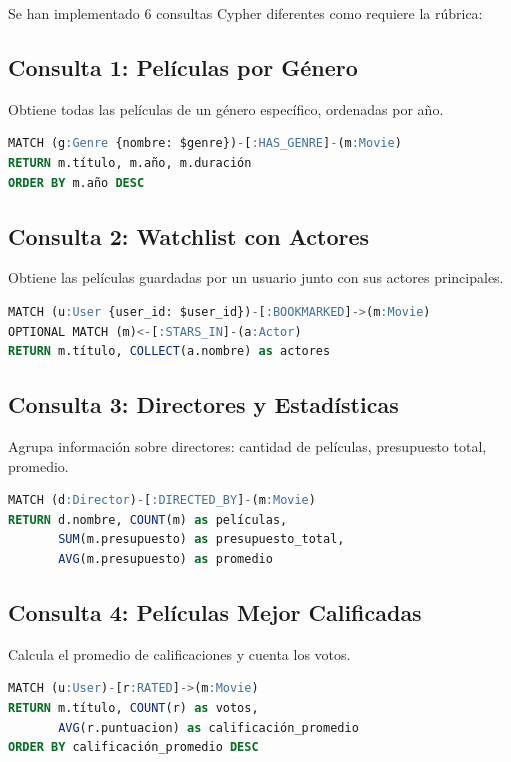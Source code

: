 \documentclass[12pt]{article}
\begin{document}
Se han implementado 6 consultas Cypher diferentes como requiere la rúbrica:

\subsection{Consulta 1: Películas por Género}

Obtiene todas las películas de un género específico, ordenadas por año.

\begin{lstlisting}[language=sql]
MATCH (g:Genre {nombre: $genre})-[:HAS_GENRE]-(m:Movie)
RETURN m.título, m.año, m.duración
ORDER BY m.año DESC
\end{lstlisting}

\subsection{Consulta 2: Watchlist con Actores}

Obtiene las películas guardadas por un usuario junto con sus actores principales.

\begin{lstlisting}[language=sql]
MATCH (u:User {user_id: $user_id})-[:BOOKMARKED]->(m:Movie)
OPTIONAL MATCH (m)<-[:STARS_IN]-(a:Actor)
RETURN m.título, COLLECT(a.nombre) as actores
\end{lstlisting}

\subsection{Consulta 3: Directores y Estadísticas}

Agrupa información sobre directores: cantidad de películas, presupuesto total, promedio.

\begin{lstlisting}[language=sql]
MATCH (d:Director)-[:DIRECTED_BY]-(m:Movie)
RETURN d.nombre, COUNT(m) as películas,
       SUM(m.presupuesto) as presupuesto_total,
       AVG(m.presupuesto) as promedio
\end{lstlisting}

\subsection{Consulta 4: Películas Mejor Calificadas}

Calcula el promedio de calificaciones y cuenta los votos.

\begin{lstlisting}[language=sql]
MATCH (u:User)-[r:RATED]->(m:Movie)
RETURN m.título, COUNT(r) as votos,
       AVG(r.puntuacion) as calificación_promedio
ORDER BY calificación_promedio DESC
\end{lstlisting}
\end{document}
